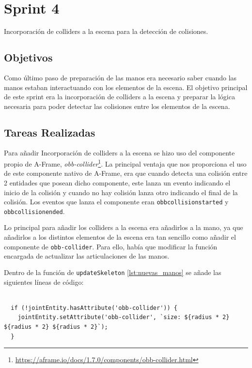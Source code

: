 \documentclass[a4paper, 12pt]{book}
\begin{document}
\section{Sprint 4}
\label{sec:sprint4}
Incorporación de colliders a la escena para la detección de colisiones.

\subsection{Objetivos}
\label{subsec:objetivo-principal4}
Como último paso de preparación de las manos era necesario saber cuando las manos estaban interactuando con los elementos de la escena. El objetivo principal de este sprint era la incorporación de colliders  
a la escena y preparar la lógica necesaria para poder detectar las colisiones entre los elementos de la escena. 

\subsection{Tareas Realizadas}
\label{subsec:implementacion4}
Para añadir Incorporación de colliders  
a la escena se hizo uso del componente propio de A-Frame, \textit{obb-collider}\footnote{\url{https://aframe.io/docs/1.7.0/components/obb-collider.html}}.
La principal ventaja que nos proporciona el uso de este componente nativo de A-Frame, era que cuando detecta una colisión entre 2 entidades que posean dicho componente, este lanza un evento indicando el inicio de la colisión y cuando no hay colisión lanza otro indicando el final de la colisión.
Los eventos que lanza el componente eran \texttt{obbcollisionstarted} y \texttt{obbcollisionended}.

Lo principal para añadir los colliders a la escena 
era añadirlos a la mano, ya que añadirlos a los distintos elementos de la escena era tan sencillo como añadir el componente de \texttt{obb-collider}. Para ello,
había que modificar la función encargada de actualizar las articulaciones de las manos. 

Dentro de la función de \texttt{updateSkeleton} \ref{lst:nuevas_manos} se añade las siguientes líneas de código:

\begin{lstlisting}[caption=Añadir Incorporación de colliders a la mano, captionpos=b, label=lst:colliders]
  
  if (!jointEntity.hasAttribute('obb-collider')) {
    jointEntity.setAttribute('obb-collider', `size: ${radius * 2} ${radius * 2} ${radius * 2}`);
  }
\end{lstlisting}
\end{document}
